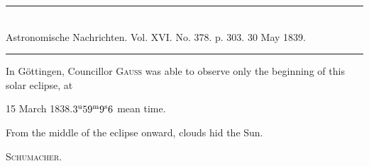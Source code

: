 \clearpage
{}
\begin{center}
\rule{0.55\linewidth}{0.4pt}\\[2pt]
Astronomische Nachrichten. Vol. XVI. No. 378. p. 303. 30 May 1839.\\[2pt]
\rule{0.55\linewidth}{0.4pt}
\end{center}

In Göttingen, Councillor \textsc{Gauss} was able to observe only the beginning of this solar eclipse, at
\begin{center}15 March 1838.\quad $3^{\rm u}59^{\rm m}9^{\rm s}6$ mean time.\end{center}
\noindent From the middle of the eclipse onward, clouds hid the Sun.
\begin{flushright}\textsc{Schumacher.}\end{flushright}


